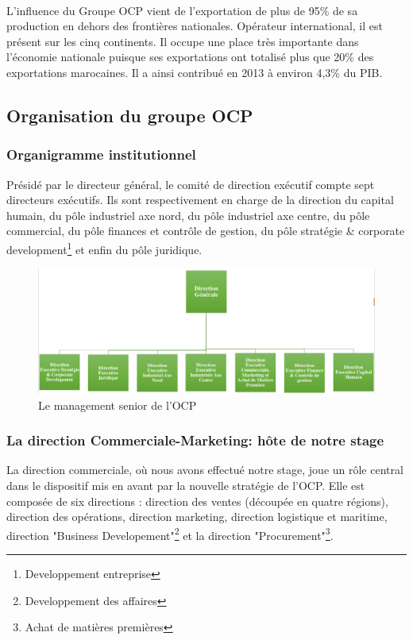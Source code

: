 		\paragraph{}
		L’influence du Groupe OCP vient de l’exportation de plus de 95\% de sa production en dehors
		des frontières nationales. Opérateur international, il est présent sur les cinq continents. Il occupe
		une place très importante dans l'économie nationale puisque ses exportations ont totalisé plus
		que 20\% des exportations marocaines. Il a ainsi contribué en 2013 à environ 4,3\% du PIB\cite{CHEMLAL}.
		\subsection{Organisation du groupe OCP}
		\subsubsection{Organigramme institutionnel}
		Présidé par le directeur général, le comité de direction exécutif compte sept directeurs exécutifs.
		Ils sont respectivement en charge de la direction du capital humain, du pôle industriel axe nord,
		du pôle industriel axe centre, du pôle commercial, du pôle finances et contrôle de gestion, du
		pôle stratégie \& corporate development\footnote{Developpement entreprise} et enfin du pôle juridique.
		\begin{figure}[H]
		    		\centering
		    		\includegraphics[scale=0.35]{Orga}
		    		\caption{Le management senior de l'OCP\cite{ocp-fil}}
		    		\label{fig:Orga}
			\end{figure}
		\subsubsection{La direction Commerciale-Marketing: hôte de notre stage}
		La direction commerciale, où nous avons effectué notre stage, joue un rôle central dans le dispositif mis
		en avant par la nouvelle stratégie de l'OCP. Elle est composée de six directions : direction des
		ventes (découpée en quatre régions), direction des opérations, direction marketing, direction
		logistique et maritime, direction "Business Developement"\footnote{Developpement des affaires} et la direction "Procurement"\footnote{Achat de matières
		premières}.
